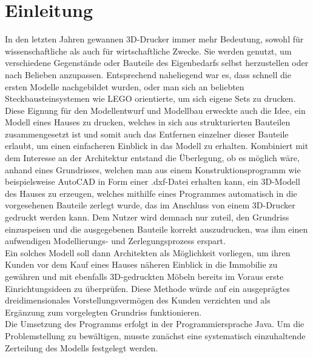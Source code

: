 \chapter{Einleitung}
In den letzten Jahren gewannen 3D-Drucker immer mehr Bedeutung, sowohl für wissenschaftliche als auch für wirtschaftliche Zwecke. 
Sie werden genutzt, um verschiedene Gegenstände oder Bauteile des Eigenbedarfs selbst herzustellen oder nach Belieben anzupassen. 
Entsprechend naheliegend war es, dass schnell die ersten Modelle nachgebildet wurden, oder man sich an beliebten Steckbausteinsystemen wie LEGO orientierte, um sich eigene Sets zu drucken. \\
Diese Eignung für den Modellentwurf und Modellbau erweckte auch die Idee, ein Modell eines Hauses zu drucken, welches in sich aus strukturierten Bauteilen zusammengesetzt ist und somit auch das Entfernen einzelner dieser Bauteile erlaubt, um einen einfacheren Einblick in das Modell zu erhalten. 
Kombiniert mit dem Interesse an der Architektur entstand die Überlegung, ob es möglich wäre, anhand eines Grundrisses, welchen man aus einem Konstruktionsprogramm wie beispielsweise AutoCAD in Form einer .dxf-Datei erhalten kann, ein 3D-Modell des Hauses zu erzeugen, welches mithilfe eines Programmes automatisch in die vorgesehenen Bauteile zerlegt wurde, das im Anschluss von einem 3D-Drucker gedruckt werden kann.
 Dem Nutzer wird demnach nur zuteil, den Grundriss einzuspeisen und die ausgegebenen Bauteile korrekt auszudrucken,  was ihm einen aufwendigen Modellierungs- und Zerlegungsprozess erspart. \\
Ein solches Modell soll dann Architekten als Möglichkeit vorliegen, um ihren Kunden vor dem Kauf eines Hauses näheren Einblick in die Immobilie zu gewähren und mit ebenfalls 3D-gedruckten Möbeln bereits im Voraus erste Einrichtungsideen zu überprüfen. 
Diese Methode würde auf ein ausgeprägtes dreidimensionales Vorstellungsvermögen des Kunden verzichten und als Ergänzung zum vorgelegten Grundriss funktionieren.\\
Die Umsetzung des Programms erfolgt in der Programmiersprache Java.
Um die Problemstellung zu bewältigen, musste zunächst eine systematisch einzuhaltende Zerteilung des Modells festgelegt werden. 

